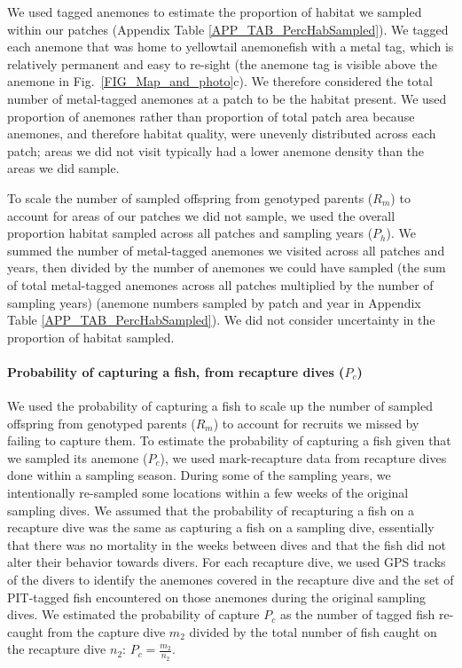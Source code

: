 \documentclass[12pt, oneside]{article}   	%
\begin{document}
We used tagged anemones to estimate the proportion of habitat we sampled within our patches (Appendix Table \ref{APP_TAB_PercHabSampled}). We tagged each anemone that was home to yellowtail anemonefish with a metal tag, which is relatively permanent and easy to re-sight (the anemone tag is visible above the anemone in Fig.\ \ref{FIG_Map_and_photo}c). We therefore considered the total number of metal-tagged anemones at a patch to be the habitat present. We used proportion of anemones rather than proportion of total patch area because anemones, and therefore habitat quality, were unevenly distributed across each patch; areas we did not visit typically had a lower anemone density than the areas we did sample. %

To scale the number of sampled offspring from genotyped parents ($R_m$) to account for areas of our patches we did not sample, we used the overall proportion habitat sampled across all patches and sampling years ($P_h$). We summed the number of metal-tagged anemones we visited across all patches and years, then divided by the number of anemones we could have sampled (the sum of total metal-tagged anemones across all patches multiplied by the number of sampling years) (anemone numbers sampled by patch and year in Appendix Table \ref{APP_TAB_PercHabSampled}). We did not consider uncertainty in the proportion of habitat sampled.

\paragraph*{Probability of capturing a fish, from recapture dives ($P_c$)} %

We used the probability of capturing a fish to scale up the number of sampled offspring from genotyped parents ($R_m$) to account for recruits we missed by failing to capture them. To estimate the probability of capturing a fish given that we sampled its anemone ($P_c$), we used mark-recapture data from recapture dives done within a sampling season. During some of the sampling years, we intentionally re-sampled some locations within a few weeks of the original sampling dives. We assumed that the probability of recapturing a fish on a recapture dive was the same as capturing a fish on a sampling dive, essentially that there was no mortality in the weeks between dives and that the fish did not alter their behavior towards divers. For each recapture dive, we used GPS tracks of the divers to identify the anemones covered in the recapture dive and the set of PIT-tagged fish encountered on those anemones during the original sampling dives. We estimated the probability of capture $P_c$ as the number of tagged fish re-caught from the capture dive $m_2$ divided by the total number of fish caught on the recapture dive $n_2$: $P_c = \frac{m_2}{n_2}$. %
\end{document}
